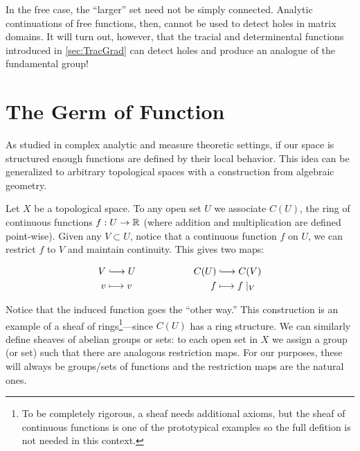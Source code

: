 In the free case, the ``larger'' set need not be simply connected. Analytic
continuations of free functions, then, cannot be used to detect holes in matrix
domains. It will turn out, however, that the tracial and determinental functions
introduced in \cref{sec:TracGrad} can detect holes and produce an analogue of
the fundamental group!

\section{The Germ of Function}%
\label{sec:germs}

As studied in complex analytic and measure theoretic settings, if our space is
structured enough functions are defined by their local behavior. This idea can
be generalized to arbitrary topological spaces with a construction from
algebraic geometry.

Let \(X\) be a topological space. To any open set \(U\) we associate \(C(U)\),
the ring of continuous functions \(f: U \to \mathbb{R} \) (where addition and
multiplication are defined point-wise).
Given any \(V \subset U\), notice that a continuous function \(f\) on \(U\), we
can restrict \(f\) to \(V\) and maintain continuity. This gives two maps:

\begin{equation*}
\begin{split}
	V &\lhook\joinrel\longrightarrow U \\
  v &\longmapsto v
\end{split} \qquad \qquad \qquad
\begin{split}
	C(U) &\lhook\joinrel\longrightarrow C(V) \\
  f &\longmapsto f \mid _V
\end{split}
\end{equation*}

Notice that the induced function goes the ``other way.'' This construction is an
example of a sheaf of rings\footnote{To be completely rigorous, a sheaf needs
  additional axioms, but the sheaf of continuous functions is one of the
  prototypical examples so the full defition is not needed in this
  context.}---since \(C(U)\) has a ring structure. We can similarly define sheaves
of abelian groups or sets: to each open set in \(X\) we assign a group (or set)
such that there are analogous restriction maps. For our purposes, these will
always be groups/sets of functions and the restriction maps are the natural ones.

